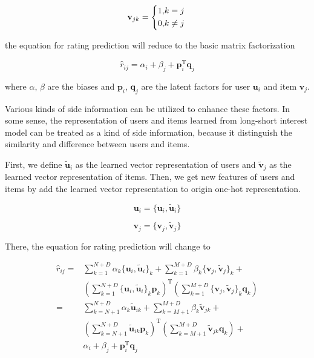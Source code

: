 \documentclass{sig-alternate-05-2015}
\begin{document}
\begin{equation}
    \mathbf{v}_{jk} =
    \left\{
        \begin{aligned}
            1, &k = j \\
            0, &k \not= j
        \end{aligned}
    \right. \\
\end{equation}

the equation for rating prediction will reduce to the basic matrix factorization

\begin{equation}
\hat{r}_{ij} = \alpha_i + \beta_j + \mathbf{p}_i ^ \mathrm{T} \mathbf{q}_j
\end{equation}

where $\alpha$, $\beta$ are the biases and $\mathbf{p}_i$, $\mathbf{q}_j$
are the latent factors for user $\mathbf{u}_i$ and item $\mathbf{v}_j$.

Various kinds of side information can be utilized to enhance these factors.
In some sense, the representation of users and items
learned from long-short interest model can be treated as a kind of side information,
because it distinguish the similarity and difference between users and items.

First, we define $\tilde{\mathbf{u}}_i$ as
the learned vector representation of users and $\tilde{\mathbf{v}}_j$ as
the learned vector representation of items.
Then, we get new features of users and items by add the learned vector representation
to origin one-hot representation.

\begin{equation}
    \mathbf{u}_{i} = \{ \mathbf{u}_{i} , \tilde{\mathbf{u}}_i \}
\end{equation}

\begin{equation}
    \mathbf{v}_{j} = \{ \mathbf{v}_{j} , \tilde{\mathbf{v}}_j \}
\end{equation}

There, the equation for rating prediction will change to

\begin{equation}
\begin{aligned}
\hat{r}_{ij} =
&\sum_{k=1}^{N+D} \alpha_k \{ \mathbf{u}_i , \tilde{\mathbf{u}}_i \}_k +
 \sum_{k=1}^{M+D} \beta_k  \{ \mathbf{v}_j , \tilde{\mathbf{v}}_j \}_k + \\
&\left( \sum_{k=1}^{N+D} \{ \mathbf{u}_i , \tilde{\mathbf{u}}_i \}_k \mathbf{p}_k \right) ^ \mathrm{T}
 \left( \sum_{k=1}^{M+D} \{ \mathbf{v}_j , \tilde{\mathbf{v}}_j \}_k \mathbf{q}_k \right) \\
= &\sum_{k=N+1}^{N+D} \alpha_k \tilde{\mathbf{u}}_{ik} +
 \sum_{k=M+1}^{M+D} \beta_k  \tilde{\mathbf{v}}_{jk} + \\
&\left( \sum_{k=N+1}^{N+D} \tilde{\mathbf{u}}_{ik} \mathbf{p}_k \right) ^ \mathrm{T}
 \left( \sum_{k=M+1}^{M+D} \tilde{\mathbf{v}}_{jk} \mathbf{q}_k \right) + \\
&\alpha_i + \beta_j + \mathbf{p}_i ^ \mathrm{T} \mathbf{q}_j
\end{aligned}
\end{equation}
\end{document}
